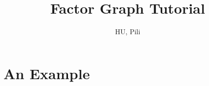 \documentclass[11pt,a4paper]{article}
\author{HU, Pili}
\title{Factor Graph Tutorial}
\begin{document}
\maketitle

\begin{abstract}
	
\end{abstract}

\pagebreak
\tableofcontents
\pagebreak

\section{An Example}



\end{document}
